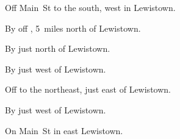 
\begin{LocationList}

Off   Main~St to the south, west in Lewistown.

By  off , 5~miles north of Lewistown.

By  just north of Lewistown.

By   just west of Lewistown.

Off  to the northeast, just east of Lewistown.

By   just west of Lewistown.

\Location{\TruckStop \Gas \Rest \Service}
On  Main~St in east Lewistown.

\end{LocationList}
